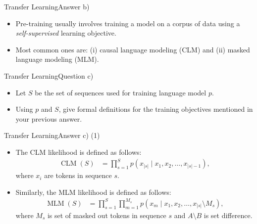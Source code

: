 \documentclass[t]{beamer}
\newcommand\op[1]{\operatorname{#1}}
\begin{document}
\begin{frame}{Transfer Learning}{Answer b)}
    \begin{itemize}
        \item Pre-training usually involves training a model on a corpus of data
              using a \emph{self-supervised} learning objective.
        \item Most common ones are: (i) causal language modeling (CLM) and (ii)
              masked language modeling (MLM).
    \end{itemize}
\end{frame}

\begin{frame}{Transfer Learning}{Question c)}
    \begin{itemize}
        \item Let $S$ be the set of sequences used for training language model
              $p$.
        \item Using $p$ and $S$, give formal definitions for the training
              objectives mentioned in your previous answer.
    \end{itemize}
\end{frame}

\begin{frame}{Transfer Learning}{Answer c) (1)}
    \begin{itemize}
        \item The CLM likelihood is defined as follows:
              \begin{align}
                  \op{CLM}(S) & = \prod_{s=1}^{S} p(x_{|s|} \mid x_1, x_2, \ldots, x_{|s|-1}),
              \end{align}
              where $x_i$ are tokens in sequence $s$.
        \item Similarly, the MLM likelihood is defined as follows:
              \begin{align}
                  \op{MLM}(S) & = \prod_{s=1}^{S} \prod_{m=1}^{M_s} p(x_m \mid x_1, x_2, \ldots, x_{|s|} \setminus M_s),
              \end{align}
              where $M_s$ is set of masked out tokens in sequence $s$ and
              $A \setminus B$ is set difference.
    \end{itemize}
\end{frame}
\end{document}

